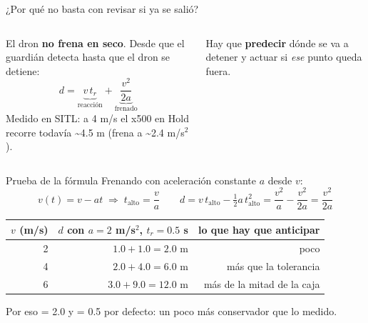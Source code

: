 \begin{frame}{¿Por qué no basta con revisar si ya se salió?}
  \begin{columns}[c]
    \small
    El dron \textbf{no frena en seco}. Desde que el guardián detecta hasta que el dron se detiene:
    \[ d = \underbrace{v\,t_r}_{\text{reacción}} + \underbrace{\frac{v^2}{2a}}_{\text{frenado}} \]
    Medido en SITL: a 4 m/s el x500 en Hold recorre todavía \textasciitilde4.5 m
    (frena a \textasciitilde2.4 m/s$^2$).
    \vspace{0.3em}
    \begin{idea}
      \small Hay que \textbf{predecir} dónde se va a detener y actuar si \emph{ese} punto queda fuera.
    \end{idea}
  \end{columns}
\end{frame}

\begin{frame}{Prueba de la fórmula}
  \small Frenando con aceleración constante $a$ desde $v$:
  \[ v(t) = v - a t \;\Rightarrow\; t_{\text{alto}} = \frac{v}{a}
     \qquad
     d = v\,t_{\text{alto}} - \tfrac12 a\,t_{\text{alto}}^2 = \frac{v^2}{a} - \frac{v^2}{2a} = \frac{v^2}{2a} \]
  \centering
  \begin{tabular}{rrr}
    \toprule
    $v$ (m/s) & $d$ con $a = 2$ m/s$^2$, $t_r = 0.5$ s & lo que hay que anticipar \\
    \midrule
    2 & $1.0 + 1.0 = 2.0$ m & poco \\
    4 & $2.0 + 4.0 = 6.0$ m & más que la tolerancia \\
    6 & $3.0 + 9.0 = 12.0$ m & más de la mitad de la caja \\
    \bottomrule
  \end{tabular}
  \vspace{0.4em}

  \raggedright\footnotesize Por eso  = 2.0 y  = 0.5 por defecto: un poco más conservador que lo medido.
\end{frame}

